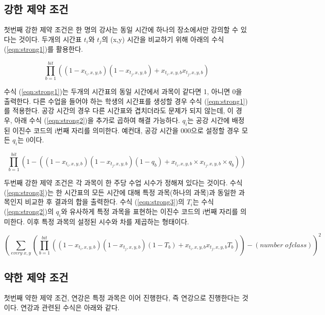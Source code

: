 \documentclass{article}
\begin{document}
    \subsection{강한 제약 조건}

첫번째 강한 제약 조건은 한 명의 강사는 동일 시간에 하나의 장소에서만 강의할 수 있다는 것이다. 두개의 시간표 $t_{i}$와 $t_{j}$의 (x,y) 시간을 비교하기 위해 아래의 수식 (\ref{eqn:strong1})를 활용한다.

    \begin{equation}\label{eqn:strong1}
        \prod_{b=1}^{bit}((1-x_{t_{i},x,y,b} )(1-x_{t_{j},x,y,b})+x_{t_{i},x,y,b} x_{t_{j},x,y,b} )
    \end{equation}

수식 (\ref{eqn:strong1})는 두개의 시간표의 동일 시간에서 과목이 같다면 1, 아니면 0을 출력한다. 다른 수업을 들어야 하는 학생의 시간표를 생성할 경우 수식 (\ref{eqn:strong1})를 적용한다. 공강 시간의 경우 다른 시간표와 겹치더라도 문제가 되지 않는데, 이 경우, 아래 수식 (\ref{eqn:strong2})을 추가로 곱하여 해결 가능하다. $q_{i}$는 공강 시간에 배정된 이진수 코드의 i번째 자리를 의미한다. 예컨대, 공강 시간을 000으로 설정할 경우 모든 $q_{i}$는 0이다.

    \begin{equation}\label{eqn:strong2}
        \prod_{b=1}^{bit}(1-((1-x_{t_{i},x,y,b} )(1-x_{t_{j},x,y,b} )(1-q_{b} )+ x_{t_{i},x,y,b}\times x_{t_{j},x,y,b} \times q_{b} )) 
    \end{equation}

두번째 강한 제약 조건은 각 과목이 한 주당 수업 시수가 정해져 있다는 것이다. 수식 (\ref{eqn:strong3})는 한 시간표의 모든 시간에 대해 특정 과목(하나의 과목)과 동일한 과목인지 비교한 후 결과의 합을 출력한다. 수식 (\ref{eqn:strong3})의 $T_{i}$는 수식 (\ref{eqn:strong2})의 $q_{i}$와 유사하게 특정 과목을 표현하는 이진수 코드의 i번째 자리를 의미한다. 이후 특정 과목의 설정된 시수와 차를 제곱하는 형태이다.

    \begin{equation}\label{eqn:strong3}
        \left( \sum_{every\;x,y} \left( \prod_{b=1}^{bit}((1-x_{t_{i},x,y,b} )(1-x_{t_{j},x,y,b} )(1-T_{b})+x_{t_{i},x,y,b} x_{t_{j},x,y,b} T_{b} ) \right) -(number\;of class)\right )^{2}
    \end{equation}

    \subsection{약한 제약 조건}

첫번째 약한 제약 조건, 연강은 특정 과목은 이어 진행한다, 즉 연강으로 진행한다는 것이다. 연강과 관련된 수식은 아래와 같다. 
\end{document}
